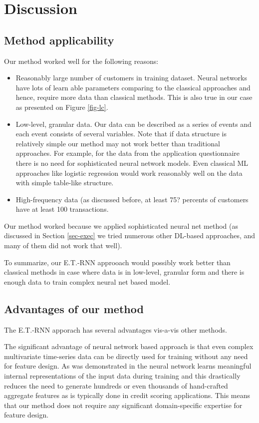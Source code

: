 \documentclass[sigconf]{acmart}
\begin{document}
\section{Discussion}

\subsection{Method applicability}

Our method worked well for the following reasons:
\begin{itemize}
    \item Reasonably large number of customers in training dataset. Neural networks have lots of learn able parameters comparing to the classical approaches and hence, require more data than classical methods. This is also true in our case as presented on Figure \ref{fig-lc}.
    \item Low-level, granular data. Our data can be described as a series of events and each event consists of several variables. Note that if data structure is relatively simple our method may not work better than traditional approaches. For example, for the data from the application questionnaire there is no need for sophisticated neural network models. Even classical ML approaches like logistic regression would work reasonably well on the data with simple table-like structure.
    \item High-frequency data (as discussed before, at least 75? percents of customers have at least 100 transactions.
\end{itemize}

Our method worked because we applied sophisticated neural net method (as discussed in Section \ref{sec-exec} we tried numerous other DL-based approaches, and many of them did not work that well).

To summarize, our E.T.-RNN approoach would possibly work better than classical methods in case where data is in low-level, granular form and there is enough data to train complex neural net based model.

\subsection{Advantages of our method}

The E.T.-RNN apporach has several advantages vis-a-vis other methods.

The significant advantage of neural network based approach is that even complex multivariate time-series data can be directly used for training without any need for feature design. As was demonstrated in \cite{Erhan2009VisualizingHF} the neural network learns meaningful internal representations of the input data during training and this drastically reduces the need to generate hundreds or even thousands of hand-crafted aggregate features as is typically done in credit scoring applications. This means that our method does not require any significant domain-specific expertise for feature design.
\end{document}
